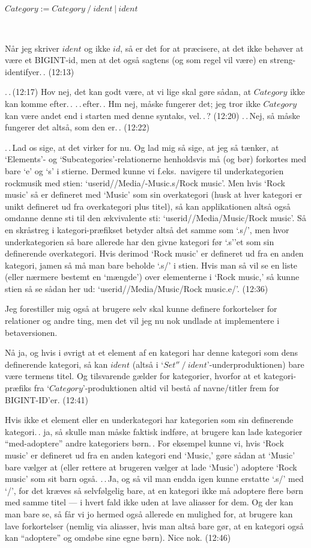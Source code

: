 \documentclass{report}
\begin{document}
$Category := Category\ \texttt{/}\ ident\ |\ ident$

\ 

Når jeg skriver $ident$ og ikke $id$, så er det for at præcisere, at det ikke behøver at være et BIGINT-id, men at det også sagtens (og som regel vil være) en streng-identifyer.\,. (12:13)

.\,.\,(12:17) Hov nej, det kan godt være, at vi lige skal gøre sådan, at $Category$ ikke kan komme efter.\,. .\,.\,efter.\,. Hm nej, måske fungerer det; jeg tror ikke $Category$ kan være andet end i starten med denne syntaks, vel.\,.\,? (12:20) .\,.\,Nej, så måske fungerer det altså, som den er.\,. (12:22)

.\,.\,Lad os sige, at det virker for nu. Og lad mig så sige, at jeg så tænker, at `Elements'- og `Subcategories'-relationerne henholdsvis må (og bør) forkortes med bare `e' og `s' i stierne. Dermed kunne vi f.eks.\ navigere til underkategorien rockmusik med stien: `userid//Media/-Music.s/Rock music'. Men hvis `Rock music' så er defineret med `Music' som sin overkategori (husk at hver kategori er unikt defineret ud fra overkategori plus titel), så kan applikationen altså også omdanne denne sti til den ækvivalente sti: `userid//Media/Music/Rock music'. Så en skråstreg i kategori-præfikset betyder altså det samme som `.s/', men hvor underkategorien så bare allerede har den givne kategori før `.s''et som sin definerende overkategori. Hvis derimod `Rock music' er defineret ud fra en anden kategori, jamen så må man bare beholde `.s/' i stien. Hvis man så vil se en liste (eller nærmere bestemt en `mængde') over elementerne i `Rock music,' så kunne stien så se sådan her ud: `userid//Media/Music/Rock music.e/'. (12:36)

Jeg forestiller mig også at brugere selv skal kunne definere forkortelser for relationer og andre ting, men det vil jeg nu nok undlade at implementere i betaversionen. 

Nå ja, og hvis i øvrigt at et element af en kategori har denne kategori som dens definerende kategori, så kan $ident$ (altså i `$Set''\ \texttt{/}\ ident$'-underproduktionen) bare være termens titel. Og tilsvarende gælder for kategorier, hvorfor at et kategori-præfiks fra `$Category$'-produktionen altid vil bestå af navne/titler frem for BIGINT-ID'er. (12:41)

Hvis ikke et element eller en underkategori har kategorien som sin definerende kategori.\,. ja, så skulle man måske faktisk indføre, at brugere kan lade kategorier ``med-adoptere'' andre kategoriers børn.\,. For eksempel kunne vi, hvis `Rock music' er defineret ud fra en anden kategori end `Music,' gøre sådan at `Music' bare vælger at (eller rettere at brugeren vælger at lade `Music') adoptere `Rock music' som sit barn også. .\,.\,Ja, og så vil man endda igen kunne erstatte `.s/' med `/', for det kræves så selvfølgelig bare, at en kategori ikke må adoptere flere børn med samme titel --- i hvert fald ikke uden at lave aliasser for dem. Og der kan man bare se, så får vi jo hermed også allerede en mulighed for, at brugere kan lave forkortelser (nemlig via aliasser, hvis man altså bare gør, at en kategori også kan ``adoptere'' og omdøbe sine egne børn). Nice nok. (12:46) 
\end{document}
